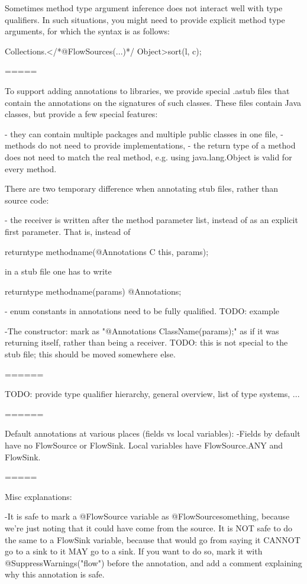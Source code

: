 Sometimes method type argument inference does not interact well with
type qualifiers. In such situations, you might need to provide
explicit method type arguments, for which the syntax is as follows:

	Collections.</*@FlowSources({...})*/ Object>sort(l, c);


=====

To support adding annotations to libraries, we provide special .astub
files that contain the annotations on the signatures of such classes.
These files contain Java classes, but provide a few special features:

- they can contain multiple packages and multiple public classes in
 one file,
- methods do not need to provide implementations,
- the return type of a method does not need to match the real method,
 e.g. using java.lang.Object is valid for every method.


There are two temporary difference when annotating stub files, rather
than source code:

- the receiver is written after the method parameter list, instead of
as an explicit first parameter.
That is, instead of

     returntype methodname(@Annotations C this, params);

in a stub file one has to write

     returntype methodname(params) @Annotations;

- enum constants in annotations need to be fully qualified. TODO: example

-The constructor:
	mark as "@Annotations ClassName(params);" as if it was returning itself, rather than being a receiver.
TODO: this is not special to the stub file; this should be moved
	somewhere else.

======

TODO: provide type qualifier hierarchy, general overview, list of type
systems, ...

======

Default annotations at various places (fields vs local variables):
-Fields by default have no FlowSource or FlowSink. Local variables have FlowSource.ANY and FlowSink{}.


=====

Misc explanations:

-It is safe to mark a @FlowSource{} variable as
 @FlowSource{something}, because we're just noting that it could have
 come from the source. It is NOT safe to do the same to a FlowSink{}
 variable, because that would go from saying it CANNOT go to a sink to
 it MAY go to a sink. If you want to do so, mark it with
 @SuppressWarnings("flow") before the annotation, and add a comment
 explaining why this annotation is safe.

